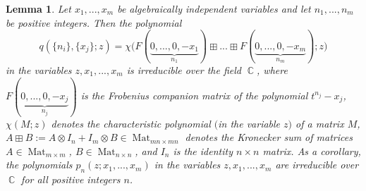 \documentclass[14pt, dvipsnames]{extarticle}
\theoremstyle{plain}
\newtheorem{lemma}{Lemma}
\theoremstyle{definition}
\theoremstyle{remark}
\DeclareMathOperator{\Cc}{\mathbb{C}}
\DeclareMathOperator{\Mat}{\mathrm{Mat}}
\begin{document}
\begin{lemma}\label{trans_extension}
Let $x_1, ..., x_m$ be algebraically independent variables and let $n_1, ..., n_m$ be positive integers. Then the polynomial
\begin{equation}\label{sum_of_Frobenius_cells}
q(\{n_i\}, \{x_j\}; z) =
\chi\bigl(F(\underset{n_1}{\underbrace{0,...,0, -x_1}})\boxplus...\boxplus F(\underset{n_m}{\underbrace{0,...,0, -x_m}}); z\bigr)
\end{equation}
in the variables $z, x_1, ..., x_m$ is irreducible over the field $\Cc$, where
$F(\underset{n_j}{\underbrace{0,...,0, -x_j}})$ is the Frobenius companion matrix of the polynomial $t^{n_j} -x_j$, $\chi(M;z)$ denotes the characteristic polynomial $($in the variable $z)$ of a matrix $M$, $A\boxplus B := A\otimes I_n + I_m\otimes B\in\Mat_{mn\times mn}$ denotes the Kronecker sum of matrices $A\in \Mat_{m\times m}$, $B\in \Mat_{n\times n}$, and $I_n$ is the identity $n\times n$ matrix. As a corollary, the polynomials $p_n(z; x_1, ..., x_m)$ in the variables $z, x_1, ..., x_m$ are irreducible over $\Cc$ for all positive integers $n$.
\end{lemma}
\end{document}
